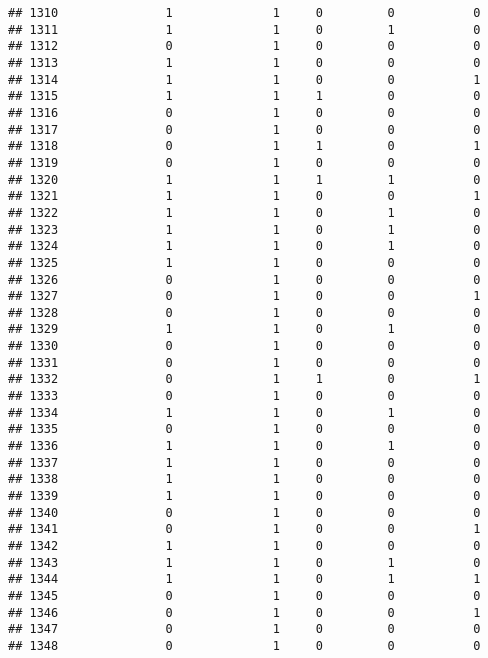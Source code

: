 \documentclass[]{article}
\begin{document}
\begin{verbatim}
## 1310               1              1     0         0           0
## 1311               1              1     0         1           0
## 1312               0              1     0         0           0
## 1313               1              1     0         0           0
## 1314               1              1     0         0           1
## 1315               1              1     1         0           0
## 1316               0              1     0         0           0
## 1317               0              1     0         0           0
## 1318               0              1     1         0           1
## 1319               0              1     0         0           0
## 1320               1              1     1         1           0
## 1321               1              1     0         0           1
## 1322               1              1     0         1           0
## 1323               1              1     0         1           0
## 1324               1              1     0         1           0
## 1325               1              1     0         0           0
## 1326               0              1     0         0           0
## 1327               0              1     0         0           1
## 1328               0              1     0         0           0
## 1329               1              1     0         1           0
## 1330               0              1     0         0           0
## 1331               0              1     0         0           0
## 1332               0              1     1         0           1
## 1333               0              1     0         0           0
## 1334               1              1     0         1           0
## 1335               0              1     0         0           0
## 1336               1              1     0         1           0
## 1337               1              1     0         0           0
## 1338               1              1     0         0           0
## 1339               1              1     0         0           0
## 1340               0              1     0         0           0
## 1341               0              1     0         0           1
## 1342               1              1     0         0           0
## 1343               1              1     0         1           0
## 1344               1              1     0         1           1
## 1345               0              1     0         0           0
## 1346               0              1     0         0           1
## 1347               0              1     0         0           0
## 1348               0              1     0         0           0

\end{verbatim}
\end{document}
